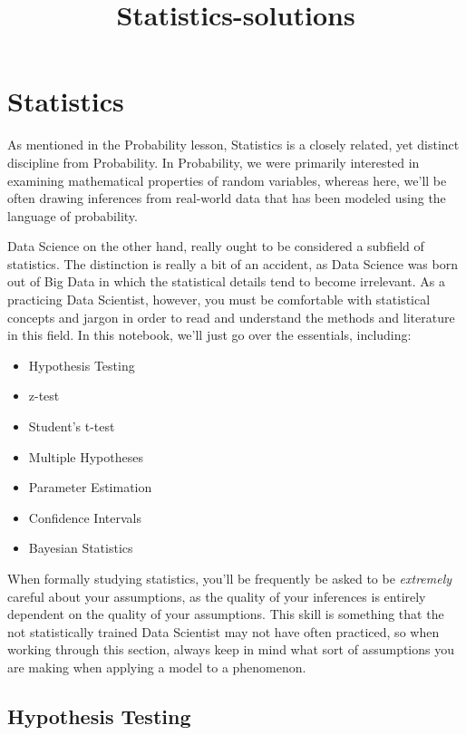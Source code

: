 \documentclass[11pt]{article}
\title{Statistics-solutions}
\providecommand{\tightlist}{%
      \setlength{\itemsep}{0pt}\setlength{\parskip}{0pt}}
\begin{document}
    
    
    \maketitle
    
    

    
    \section{Statistics}\label{statistics}

As mentioned in the Probability lesson, Statistics is a closely related,
yet distinct discipline from Probability. In Probability, we were
primarily interested in examining mathematical properties of random
variables, whereas here, we'll be often drawing inferences from
real-world data that has been modeled using the language of probability.

Data Science on the other hand, really ought to be considered a subfield
of statistics. The distinction is really a bit of an accident, as Data
Science was born out of Big Data in which the statistical details tend
to become irrelevant. As a practicing Data Scientist, however, you must
be comfortable with statistical concepts and jargon in order to read and
understand the methods and literature in this field. In this notebook,
we'll just go over the essentials, including:

\begin{itemize}
\tightlist
\item
  Hypothesis Testing
\item
  z-test
\item
  Student's t-test
\item
  Multiple Hypotheses
\item
  Parameter Estimation
\item
  Confidence Intervals
\item
  Bayesian Statistics
\end{itemize}

When formally studying statistics, you'll be frequently be asked to be
\emph{extremely} careful about your assumptions, as the quality of your
inferences is entirely dependent on the quality of your assumptions.
This skill is something that the not statistically trained Data
Scientist may not have often practiced, so when working through this
section, always keep in mind what sort of assumptions you are making
when applying a model to a phenomenon.

    \subsection{Hypothesis Testing}\label{hypothesis-testing}
\end{document}
